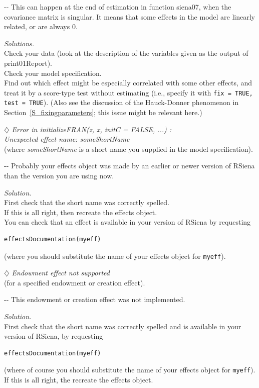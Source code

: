 \documentclass[a4paper,fleqn,11pt]{article}
\makeatletter
\newcommand{\+}{\, + \,}
\newcommand{\rs}{{\sf RSiena}}
\newenvironment{indentation}[2]
{\par \setlength{\leftmargin}{#1}       \setlength{\rightmargin}{#2}
  \advance\linewidth -\leftmargin       \advance\linewidth -\rightmargin
  \advance\@totalleftmargin\leftmargin  \@setpar{{\@@par}}%
  \parshape 1 \@totalleftmargin         \linewidth \ignorespaces}{\par}
\makeatother
\begin{document}
\begin{indentation}{0.04\textwidth}{0pt}
\noindent
This can happen at the end of estimation in function \textsf{siena07},
when the covariance matrix is singular.
It means that some effects in the model are linearly related,
or are always 0.
\smallskip

\noindent
\emph{Solutions.}\\
Check your data (look at the description of the variables
given as the output of \textsf{print01Report}).\\
Check your model specification.\\
Find out which effect might be especially correlated
with some other effects, and treat it by a score-type
test without estimating (i.e., specify it with
\texttt{fix = TRUE, test = TRUE}).
(Also see the discussion of the Hauck-Donner phenomenon
in Section~\ref{S_fixingparameters}; this issue might
be relevant here.)
\end{indentation}
\bigskip

\noindent $\diamondsuit$ \emph{Error in initializeFRAN(z, x, initC = FALSE, ...) :\\
  Unexpected effect name: someShortName}\\
(where \emph{someShortName} is a short name you supplied in the
model specification).
\smallskip

\begin{indentation}{0.04\textwidth}{0pt}
\noindent
Probably your effects object was made by an earlier or newer version
of {\rs} than the version you are using now.
\smallskip

\noindent
\emph{Solution.} \\
First check that the short name was correctly spelled.\\
If this is all right, then recreate the effects object.\\
You can check that an effect is available in your version of
{\rs} by requesting
\begin{verbatim}
effectsDocumentation(myeff)
\end{verbatim}
(where you should substitute the name of your effects object
for \texttt{myeff}).
\end{indentation}
\bigskip


\noindent $\diamondsuit$ \emph{Endowment effect not supported}\\
(for a specified endowment or creation effect).
\smallskip

\begin{indentation}{0.04\textwidth}{0pt}
\noindent
This endowment or creation effect was not implemented.
\smallskip

\noindent
\emph{Solution.} \\
First check that the short name was correctly spelled and
is available in your version of {\rs}, by requesting
\begin{verbatim}
effectsDocumentation(myeff)
\end{verbatim}
(where of course you should substitute the name of your effects object
for \texttt{myeff}).
If this is all right, the recreate the effects object.
\end{indentation}
\bigskip
\end{document}
